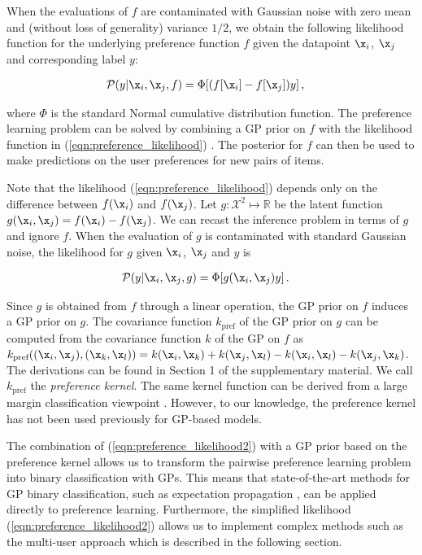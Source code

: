 When the evaluations of $f$ are contaminated with Gaussian noise with zero mean and (without loss of generality) variance $1/2$, we obtain the following likelihood function for the underlying preference function $f$ given the datapoint $\x_i$, $\x_j$ and corresponding label $y$:

\begin{align}
\mathcal{P}(y|\x_i,\x_j,f) &= \Phi[(f[\x_i] - f[\x_j])y]\,,\label{eqn:preference_likelihood}
\end{align}

where $\Phi$ is the standard Normal cumulative distribution function. The preference learning problem can be solved by combining a GP prior on $f$ with the likelihood function in (\ref{eqn:preference_likelihood}) \citep{Chu2005}. The posterior for $f$ can
then be used to make predictions on the user preferences for new pairs of items.

Note that the likelihood (\ref{eqn:preference_likelihood}) depends only on the difference between $f(\x_i)$ and $f(\x_j)$.
Let $g:\mathcal{X}^2\mapsto\mathbb{R}$ be the latent function $g(\x_i,\x_j) = f(\x_i) - f(\x_j)$.
We can recast the inference problem in terms of $g$ and ignore $f$. When the evaluation of $g$ is contaminated with standard Gaussian noise, the likelihood for $g$ given $\x_i$, $\x_j$ and $y$ is

\begin{align}
\mathcal{P}(y|\x_i,\x_j,g) &= \Phi[g(\x_i, \x_j)y]\,.\label{eqn:preference_likelihood2}
\end{align}

Since $g$ is obtained from $f$ through a linear operation, the GP prior on $f$ induces a GP prior on $g$.
The covariance function $k_\text{pref}$ of the GP prior on $g$ can be computed from the covariance function $k$ of the GP on $f$ as $k_\text{pref}((\x_i,\x_j),(\x_k,\x_l)) = k(\x_i,\x_k) + k(\x_j,\x_l) - k(\x_i,\x_l) - k(\x_j,\x_k)$. The derivations can be found in Section 1 of the supplementary material. We call $k_\text{pref}$ the \emph{preference kernel}. The same kernel function can be derived from a large margin classification viewpoint \citep{Furnkranz2010}. However, to our knowledge, the preference kernel has not been used previously for GP-based models.	

The combination of (\ref{eqn:preference_likelihood2}) with a GP prior based on the preference kernel allows us to transform the pairwise preference learning problem into  binary classification with GPs. This means that state-of-the-art methods for GP binary classification, such as expectation propagation \citep{Minka2001}, can be applied directly to preference learning. Furthermore, the simplified likelihood (\ref{eqn:preference_likelihood2}) allows us to implement complex methods such as the multi-user approach which is described in the following section.

